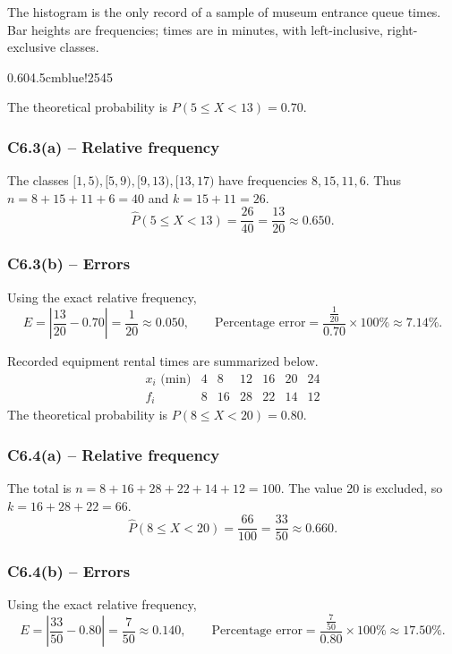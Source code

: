 {
The histogram is the only record of a sample of museum entrance queue times.
Bar heights are frequencies; times are in minutes, with left-inclusive,
right-exclusive classes.
\begin{center}
{0.60\textwidth}{4.5cm}{blue!25}{4}{5}
\end{center}
The theoretical probability is $P(5\le X<13)=0.70$.
\label{sol:c6-3a}
\subsubsection*{C6.3(a) -- Relative frequency }
The classes $[1,5),[5,9),[9,13),[13,17)$ have frequencies
$8,15,11,6$. Thus $n=8+15+11+6=40$ and $k=15+11=26$.
\[
\widehat P(5\le X<13)=\frac{26}{40}=\frac{13}{20}\approx0.650.
\]
\label{sol:c6-3b}
\subsubsection*{C6.3(b) -- Errors }
Using the exact relative frequency,
\[
E=\left|\frac{13}{20}-0.70\right|=\frac{1}{20}\approx0.050,\qquad
\text{Percentage error}=\frac{\frac{1}{20}}{0.70}\times100\%\approx7.14\%.
\]
\secInicio[sec:c6-3]

}

{
Recorded equipment rental times are summarized below.
\[
\begin{array}{c|rrrrrr}
x_i\text{ (min)}&4&8&12&16&20&24\\\hline
f_i&8&16&28&22&14&12
\end{array}
\]
The theoretical probability is $P(8\le X<20)=0.80$.
\label{sol:c6-4a}
\subsubsection*{C6.4(a) -- Relative frequency }
The total is $n=8+16+28+22+14+12=100$.
The value 20 is excluded, so $k=16+28+22=66$.
\[
\widehat P(8\le X<20)=\frac{66}{100}=\frac{33}{50}\approx0.660.
\]
\label{sol:c6-4b}
\subsubsection*{C6.4(b) -- Errors }
Using the exact relative frequency,
\[
E=\left|\frac{33}{50}-0.80\right|=\frac{7}{50}\approx0.140,\qquad
\text{Percentage error}=\frac{\frac{7}{50}}{0.80}\times100\%\approx17.50\%.
\]
\secInicio[sec:c6-4]

}

